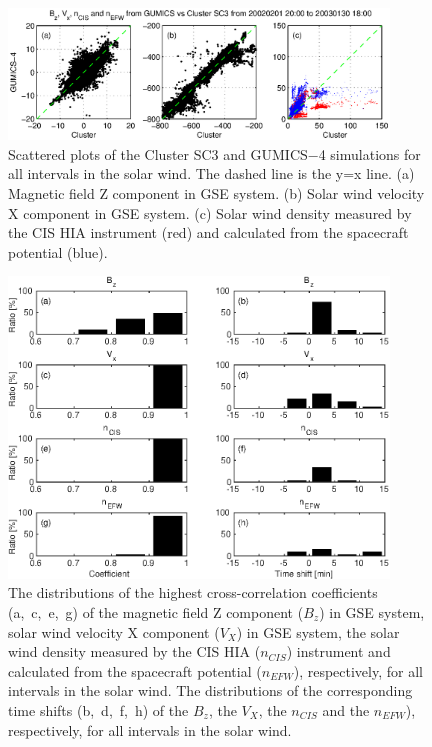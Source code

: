 \documentclass[linenumbers,draft]{agujournal}
\begin{document}
\pagebreak

\begin{figure}[h]
\centering
\includegraphics[width=0.9\textwidth,angle=0]{swe-2021-corr-f04}
\caption{Scattered plots of the Cluster SC3 and GUMICS$-$4 simulations for all intervals in the solar wind. The dashed line is the y=x line. (a) Magnetic field Z component in GSE system. (b) Solar wind velocity X component in GSE system. (c) Solar wind density measured by the CIS HIA instrument (red) and calculated from the spacecraft potential (blue).}
\label{fig:swscatplot}
\end{figure}

\pagebreak

\begin{figure}[h]
\centering
\includegraphics[width=0.9\textwidth,angle=0]{swe-2021-corr-f05} 
\caption{The distributions of the highest cross-correlation coefficients (a,~c,~e,~g) of the magnetic field Z component ($B_z$) in GSE system, solar wind velocity X component ($V_X$) in GSE system, the solar wind density measured by the CIS HIA ($n_{CIS}$) instrument and calculated from the spacecraft potential ($n_{EFW}$), respectively, for all intervals in the solar wind. The distributions of the corresponding time shifts (b,~d,~f,~h) of the $B_z$, the $V_X$, the $n_{CIS}$ and the $n_{EFW}$), respectively, for all intervals in the solar wind.}
\label{fig:swcorrplot}
\end{figure}
\end{document}
